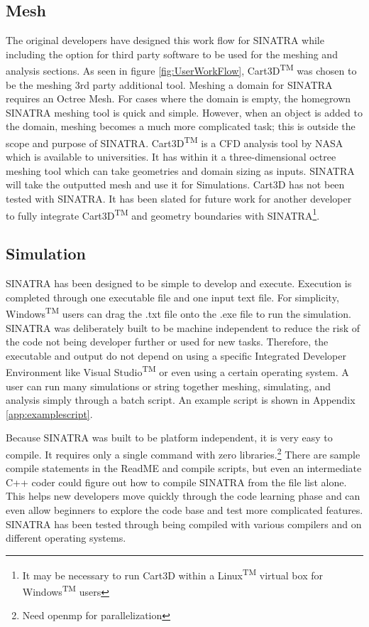\subsection{Mesh}
The original developers have designed this work flow for SINATRA while including the option for third party software to be used for the meshing and analysis sections. As seen in figure \ref{fig:UserWorkFlow}, Cart3D\textsuperscript{TM} \cite{cart3d} was chosen to be the meshing 3rd party additional tool. Meshing a domain for SINATRA requires an Octree Mesh. For cases where the domain is empty, the homegrown SINATRA meshing tool is quick and simple. However, when an object is added to the domain, meshing becomes a much more complicated task; this is outside the scope and purpose of SINATRA. Cart3D\textsuperscript{TM} is a CFD analysis tool by NASA which is available to universities. It has within it a three-dimensional octree meshing tool which can take geometries and domain sizing as inputs. SINATRA will take the outputted mesh and use it for Simulations. Cart3D has not been tested with SINATRA. It has been slated for future work for another developer to fully integrate Cart3D\textsuperscript{TM} and geometry boundaries with SINATRA\footnote{It may be necessary to run Cart3D within a Linux\textsuperscript{TM} virtual box for Windows\textsuperscript{TM} users}. \par

\subsection{Simulation}

SINATRA has been designed to be simple to develop and execute. Execution is completed through one executable file and one input text file. For simplicity, Windows\textsuperscript{TM} users can drag the .txt file onto the .exe file to run the simulation. SINATRA was deliberately built to be machine independent to reduce the risk of the code not being developer further or used for new tasks. Therefore, the executable and output do not depend on using a specific Integrated Developer Environment like Visual Studio\textsuperscript{TM} or even using a certain operating system. A user can run many simulations or string together meshing, simulating, and analysis simply through a batch script. An example script is shown in Appendix \ref{app:examplescript}. \par
Because SINATRA was built to be platform independent, it is very easy to compile. It requires only a single command with zero libraries.\footnote{Need openmp for parallelization} There are sample compile statements in the ReadME and compile scripts, but even an intermediate C++ coder could figure out how to compile SINATRA from the file list alone. This helps new developers move quickly through the code learning phase and can even allow beginners to explore the code base and test more complicated features. SINATRA has been tested through being compiled with various compilers and on different operating systems.  

